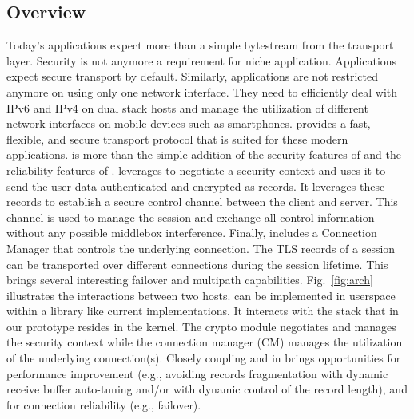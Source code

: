 


\subsection{Overview}
Today's applications expect more than a simple bytestream from the transport
layer. Security is not anymore a requirement for niche application. Applications
expect secure transport by default. Similarly, applications are not restricted
anymore on using only one network interface. They need to efficiently deal with
IPv6 and IPv4 on dual stack hosts and manage the utilization of different
network interfaces on mobile devices such as smartphones. \tcpls provides a
fast, flexible, and secure transport protocol that is suited for these modern
applications. \tcpls is more than the simple addition of the security features
of \tls and the reliability features of \tcp. \tcpls leverages  to
negotiate a security context and uses it to send the user data authenticated and
encrypted as \tls records. It leverages these records to establish a secure
control channel between the client and server. This channel is used to manage
the \tcpls session and exchange all control information without any possible
middlebox interference. Finally, \tcpls includes a Connection Manager that
controls the underlying \tcp connection. The TLS records of a \tcpls session can
be transported over different \tcp connections during the session lifetime. This
brings several interesting failover and multipath capabilities.
Fig.~\ref{fig:arch} illustrates the interactions between two \tcpls hosts.
\tcpls can be implemented in userspace within a library like current \tls
implementations. It interacts with the \tcp stack that in our prototype resides
in the kernel. The crypto module negotiates and manages the security context
while the connection manager (CM) manages the utilization of the underlying \tcp
connection(s). Closely coupling \tcp and \tls in \tcpls brings opportunities for
performance improvement (e.g., avoiding records fragmentation with dynamic
receive buffer auto-tuning and/or with dynamic control of the record length),
and for connection reliability (e.g., failover).


